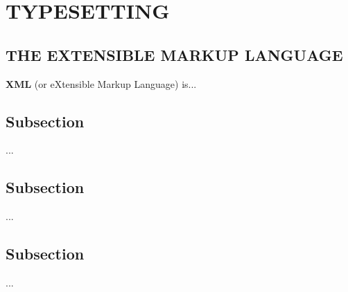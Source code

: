 \documentclass[../report.tex]{subfiles}
\begin{document}
\section{TYPESETTING} %

\subsection{THE EXTENSIBLE MARKUP LANGUAGE}

\textbf{XML} (or eXtensible Markup Language) is...

\subsection{Subsection}

...

\subsection{Subsection}

...

\subsection{Subsection}

...
\end{document}

